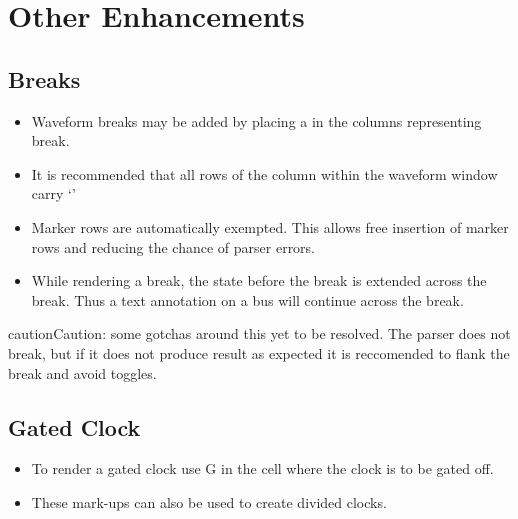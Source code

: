 \documentclass[letterpaper,10pt,english]{sphinxmanual}
\begin{document}
\section{Other Enhancements}
\label{\detokenize{step_by_step:other-enhancements}}

\subsection{Breaks}
\label{\detokenize{step_by_step:id1}}\begin{itemize}
\item {} 
Waveform breaks may be added by placing a \textbar{} in the columns representing break.

\item {} 
It is recommended that all rows of the column within the waveform window  carry ‘\textbar{}’

\item {} 
Marker rows are automatically exempted. This allows free insertion of marker rows and reducing the chance of parser errors.

\item {} 
While rendering a break, the state before the break is extended across the break. Thus a text annotation on a bus will continue across the break.

\end{itemize}

\begin{sphinxadmonition}{caution}{Caution:}
some gotchas around this yet to be resolved. The parser does not break, but if it does not produce result as expected it is reccomended to flank the break and avoid toggles.
\end{sphinxadmonition}


\subsection{Gated Clock}
\label{\detokenize{step_by_step:gated-clock}}\begin{itemize}
\item {} 
To render a gated clock use G in the cell where the clock is to be gated off.

\item {} 
These mark-ups can also be used to create divided clocks.

\end{itemize}
\end{document}
